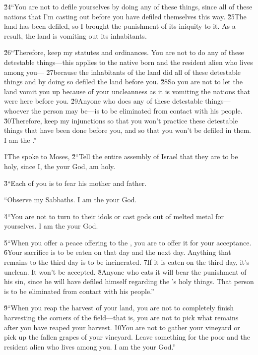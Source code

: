 \v{24}``You are not to defile yourselves by doing any of these things, since all of these nations that I'm casting out before you have defiled themselves this way. \v{25}The land has been defiled, so I brought the punishment of its iniquity to it. As a result, the land is vomiting out its inhabitants.

\v{26}``Therefore, keep my statutes and ordinances. You are not to do any of these detestable things---this applies to the native born and the resident alien who lives among you--- \v{27}because the inhabitants of the land did all of these detestable things and by doing so defiled the land before you. \v{28}So you are not to let the land vomit you up because of your uncleanness as it is vomiting the nations that were here before you. \v{29}Anyone who does any of these detestable things---whoever the person may be---is to be eliminated from contact with his people. \v{30}Therefore, keep my injunctions so that you won't practice these detestable things that have been done before you, and so that you won't be defiled in them. I am the .''

\v{1}The  spoke to Moses, \v{2}``Tell the entire assembly of Israel that they are to be holy, since I, the  your God, am holy.

\v{3}``Each of you is to fear his mother and father.

``Observe my Sabbaths. I am the  your God.

\v{4}``You are not to turn to their idols or cast gods out of melted metal for yourselves. I am the  your God.

\v{5}``When you offer a peace offering to the , you are to offer it for your acceptance. \v{6}Your sacrifice is to be eaten on that day and the next day. Anything that remains to the third day is to be incinerated. \v{7}If it is eaten on the third day, it's unclean. It won't be accepted. \v{8}Anyone who eats it will bear the punishment of his sin, since he will have defiled himself regarding the 's holy things. That person is to be eliminated from contact with his people.''

\v{9}``When you reap the harvest of your land, you are not to completely finish harvesting the corners of the field---that is, you are not to pick what remains after you have reaped your harvest. \v{10}You are not to gather your vineyard or pick up the fallen grapes of your vineyard. Leave something for the poor and the resident alien who lives among you. I am the  your God.''

